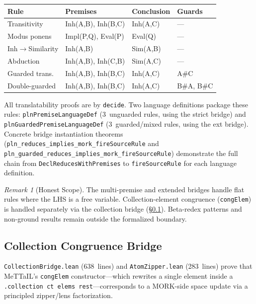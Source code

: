 \documentclass[11pt]{article}
\theoremstyle{definition}
\theoremstyle{remark}
\newtheorem{remark}[theorem]{Remark}
\newcommand{\MORK}{\textup{MORK}}
\newcommand{\MeTTaIL}{\textup{MeTTaIL}}
\begin{document}
\begin{center}
\begin{tabular}{@{}llll@{}}
\toprule
\textbf{Rule} & \textbf{Premises} & \textbf{Conclusion} & \textbf{Guards} \\
\midrule
Transitivity       & Inh(A,B), Inh(B,C)             & Inh(A,C)  & --- \\
Modus ponens       & Impl(P,Q), Eval(P)              & Eval(Q)   & --- \\
Inh$\to$Similarity & Inh(A,B)                        & Sim(A,B)  & --- \\
Abduction          & Inh(A,B), Inh(C,B)              & Sim(A,C)  & --- \\
Guarded trans.     & Inh(A,B), Inh(B,C)              & Inh(A,C)  & A\#C \\
Double-guarded     & Inh(A,B), Inh(B,C)              & Inh(A,C)  & B\#A, B\#C \\
\bottomrule
\end{tabular}
\end{center}

\noindent
All translatability proofs are by \texttt{decide}.
Two language definitions package these rules:
\texttt{plnPremiseLanguageDef} (3~unguarded rules, using the strict bridge)
and \texttt{plnGuardedPremiseLanguageDef} (3~guarded/mixed rules, using the
ext bridge).  Concrete bridge instantiation theorems
(\texttt{pln\_reduces\_implies\_mork\_fireSourceRule} and
\texttt{pln\_guarded\_reduces\_implies\_mork\_fireSourceRule})
demonstrate the full chain from \texttt{DeclReducesWithPremises} to
\texttt{fireSourceRule} for each language definition.

\begin{remark}[Honest Scope]
The multi-premise and extended bridges handle flat rules where the LHS is
a free variable.  Collection-element congruence (\texttt{congElem}) is
handled separately via the collection bridge (\S\ref{sec:collbridge}).
Beta-redex patterns and non-ground results remain outside the formalized
boundary.
\end{remark}

\subsection{Collection Congruence Bridge}
\label{sec:collbridge}

\texttt{CollectionBridge.lean} (638~lines) and \texttt{AtomZipper.lean}
(283~lines) prove that \MeTTaIL{}'s \texttt{congElem} constructor---which
rewrites a single element inside a \texttt{.collection ct elems rest}---corresponds
to a \MORK{}-side space update via a principled zipper/lens factorization.
\end{document}

